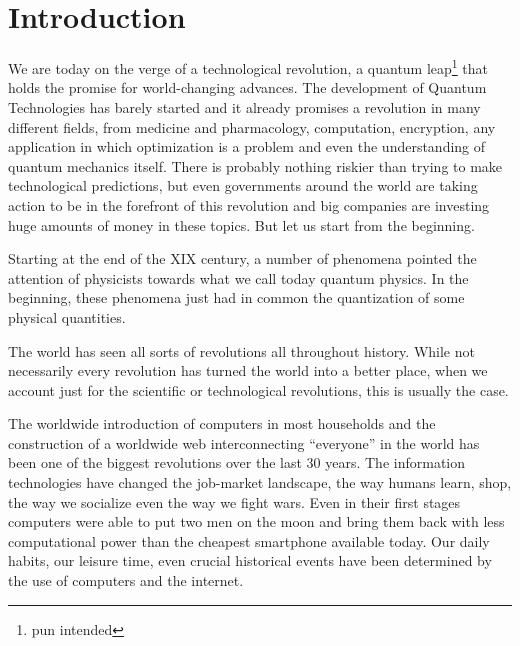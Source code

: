 \chapter{Introduction}

%
%
%

We are today on the verge of a technological revolution, a quantum leap\footnote{pun intended} that holds the promise for world-changing advances. 
The development of Quantum Technologies has barely started and it already promises a revolution in many different fields, from medicine and pharmacology, computation, encryption, any application in which optimization is a problem and even the understanding of quantum mechanics itself.
There is probably nothing riskier than trying to make technological predictions, but even governments around the world are taking action to be in the forefront of this revolution\cite{QTF} and big companies are investing huge amounts of money in these topics. But let us start from the beginning.
\medbreak

Starting at the end of the XIX century, a number of phenomena pointed the attention of physicists towards what we call today quantum physics. In the beginning, these phenomena just had in common the quantization of some physical quantities.




The world has seen all sorts of revolutions all throughout history. While not necessarily every revolution has turned the world into a better place, when we account just for the scientific or technological revolutions, this is usually the case.
\medbreak


The worldwide introduction of computers in most households and the construction of a worldwide web interconnecting ``everyone'' in the world has been one of the biggest revolutions over the last 30 years. The information technologies have changed the job-market landscape, the way humans learn, shop, the way we socialize even the way we fight wars. Even in their first stages computers were able to put two men on the moon and bring them back with less computational power than the cheapest smartphone available today.
Our daily habits, our leisure time, even crucial historical events\cite{Alhindi2012} have been determined by the use of computers and the internet.

